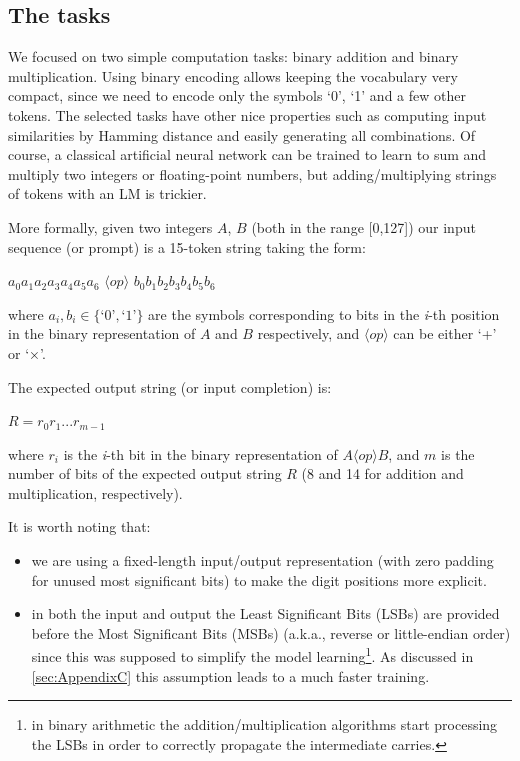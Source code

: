 \documentclass[final,1p,times,authoryear]{elsarticle}
\begin{document}
\subsection{The tasks} \label{subsec:TheTasks}

We focused on two simple computation tasks: binary addition and binary multiplication. Using binary encoding allows keeping the vocabulary very compact, since we need to encode only the symbols ‘0’, ‘1’ and a few other tokens. The selected tasks have other nice properties such as computing input similarities by Hamming distance and easily generating all combinations. Of course, a classical artificial neural network can be trained to learn to sum and multiply two integers or floating-point numbers, but adding/multiplying strings of tokens with an LM is trickier. 

More formally, given two integers $A$, $B$ (both in the range [0,127]) our input sequence (or prompt) is a 15-token string taking the form:

\begin{center}
$a_0 a_1 a_2 a_3 a_4 a_5 a_6$ $\langle op \rangle$ $b_0 b_1 b_2 b_3 b_4 b_5 b_6$
\end{center}

where $a_i,b_i\in\{\textrm{‘0’},\textrm{‘1’}\}$ are the symbols corresponding to bits in the \textit{i}-th position in the binary representation of $A$ and $B$ respectively, and $\langle op \rangle$ can be either ‘+’ or ‘×’.

The expected output string (or input completion) is:

\begin{center}
$R=r_0 r_1 ... r_{m-1}$
\end{center}

where $r_i$ is the \textit{i}-th bit in the binary representation of $A \langle op \rangle B$, and $m$ is the number of bits of the expected output string $R$ (8 and 14 for addition and multiplication, respectively).

It is worth noting that:
\begin{itemize}
\item we are using a fixed-length input/output representation (with zero padding for unused most significant bits) to make the digit positions more explicit.
\item in both the input and output the Least Significant Bits (LSBs) are provided before the Most Significant Bits (MSBs) (a.k.a., reverse or little-endian order) since this was supposed to simplify the model learning\footnote{in binary arithmetic the addition/multiplication algorithms start processing the LSBs in order to correctly propagate the intermediate carries.}. As discussed in \ref{sec:AppendixC} this assumption leads to a much faster training.
\end{itemize}
\end{document}

